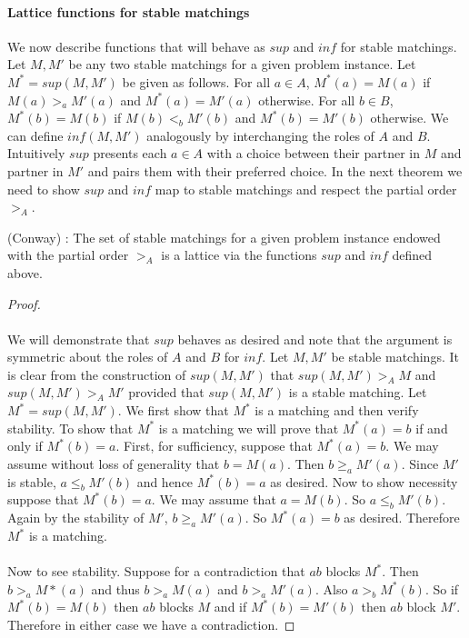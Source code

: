 \paragraph{Lattice functions for stable matchings} We now describe functions that will behave as $sup$ and $inf$ for stable matchings. Let $M, M'$ be any two stable matchings for a given problem instance. Let $M^* = sup(M,M')$ be given as follows. For all $a \in A$, $M^*(a) = M(a)$ if $M(a) >_a M'(a)$ and $M^*(a) = M'(a)$ otherwise. For all $b \in B$, $M^*(b) = M(b)$ if $M(b) <_b M'(b)$ and $M^*(b) = M'(b)$ otherwise. We can define $inf(M,M')$ analogously by interchanging the roles of $A$ and $B$. Intuitively $sup$  presents each $a \in A$ with a choice between their partner in $M$ and partner in $M'$ and pairs them with their preferred choice. In the next theorem we need to show $sup$ and $inf$ map to stable matchings and respect the partial order $>_A$.
\begin{theorem}(Conway) \cite{knuthmariages}: The set of stable matchings for a given problem instance endowed with the partial order $>_A$ is a lattice via the functions $sup$ and $inf$ defined above.
\end{theorem}
\begin{proof}
\paragraph{}
We will demonstrate that $sup$ behaves as desired and note that the argument is symmetric about the roles of $A$ and $B$ for $inf$. Let $M, M'$ be stable matchings. It is clear from the construction of $sup(M,M')$ that $sup(M,M') >_A M$ and $sup(M,M') >_A M'$ provided that $sup(M,M')$ is a stable matching. Let $M^* = sup(M,M')$. We first show that $M^*$ is a matching and then verify stability. To show that $M^*$ is a matching we will prove that $M^*(a) = b$ if and only if $M^*(b) = a$. First, for sufficiency, suppose that $M^*(a) = b$.  We may assume without loss of generality that $b = M(a)$. Then $b \geq_a M'(a)$. Since $M'$ is stable, $a \leq_b M'(b)$ and hence $M^*(b) = a$ as desired. Now to show necessity suppose that $M^*(b) = a$. We may assume that $a = M(b)$. So $a \leq_b M'(b)$. Again by the stability of $M'$, $b \geq_a M'(a)$. So $M^*(a) = b$ as desired. Therefore $M^*$ is a matching. 
\paragraph{}
Now to see stability. Suppose for a contradiction that $ab$ blocks $M^*$. Then $b >_a M*(a)$ and thus $b>_a M(a)$ and $b >_a M'(a)$. Also $a >_b M^*(b)$. So if $M^*(b) = M(b)$ then $ab$ blocks $M$ and if $M^*(b) = M'(b)$ then $ab$ block $M'$. Therefore in either case we have  a contradiction. \end{proof}

